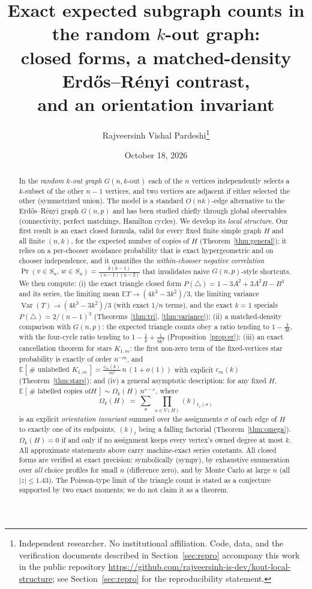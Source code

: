 \documentclass[11pt,a4paper]{article}
\title{Exact expected subgraph counts in the random $k$-out graph:\\
closed forms, a matched-density Erd\H{o}s--R\'enyi contrast,\\ and an orientation invariant}
\author{Rajveersinh Vishal Pardeshi\thanks{Independent researcher. No institutional
affiliation. Code, data, and the verification documents described in
Section~\ref{sec:repro} accompany this work in the public repository
\url{https://github.com/rajveersinh-is-dev/kout-local-structure}; see
Section~\ref{sec:repro} for the reproducibility statement.}}
\date{October 18, 2026}
\theoremstyle{definition}
\theoremstyle{definition}
\begin{document}
\maketitle

\begin{abstract}
In the \emph{random $k$-out graph} $G(n,k\text{-out})$ each of the $n$ vertices
independently selects a $k$-subset of the other $n-1$ vertices, and two vertices are
adjacent if either selected the other (symmetrized union). The model is a standard
$O(nk)$-edge alternative to the Erd\H{o}s--R\'enyi graph $G(n,p)$ and has been studied
chiefly through global observables (connectivity, perfect matchings, Hamilton cycles).
We develop its \emph{local structure}. Our first result is an exact closed formula,
valid for every fixed finite simple graph $H$ and all finite $(n,k)$, for the expected
number of copies of $H$ (Theorem~\ref{thm:general}); it relies on a per-chooser
avoidance probability that is exact hypergeometric and on chooser independence, and it
quantifies the \emph{within-chooser negative correlation}
$\Pr(v\in S_u,\, w\in S_u)=\frac{k(k-1)}{(n-1)(n-2)}$ that invalidates naive
$G(n,p)$-style shortcuts. We then compute: (i) the exact triangle closed form
$P(\triangle)=1-3A^{2}+3A^{2}B-B^{3}$ and its series, the limiting mean
$\mathbb E T \to (4k^{3}-3k^{2})/3$, the limiting variance
$\operatorname{Var}(T)\to(4k^{3}-3k^{2})/3$ (with exact $1/n$ terms), and the exact
$k=1$ specials $P(\triangle)=2/(n-1)^3$ (Theorems~\ref{thm:tri},
\ref{thm:variance}); (ii) a matched-density comparison with $G(n,p)$: the expected
triangle counts obey a ratio tending to $1-\frac{3}{4k}$, with the four-cycle ratio
tending to $1-\frac{1}{k}+\frac{1}{8k^{2}}$ (Proposition~\ref{prop:er}); (iii) an
exact cancellation theorem for stars $K_{1,m}$: the first non-zero term of the
fixed-vertices star probability is exactly of order $n^{-m}$, and
$\mathbb E[\,\#\text{ unlabelled }K_{1,m}\,] = \frac{c_m(k)}{m!}\,n\,(1+o(1))$ with
explicit $c_m(k)$ (Theorem~\ref{thm:stars}); and (iv) a general asymptotic
description: for any fixed $H$, $\mathbb E[\,\#\text{ labelled copies of
}H\,]\sim\Omega_k(H)\, n^{v-e}$, where
\[
\Omega_k(H)\;=\;\sum_{\sigma}\ \prod_{x\in V(H)}(k)_{t_x(\sigma)}
\]
is an explicit \emph{orientation invariant} summed over the assignments $\sigma$ of
each edge of $H$ to exactly one of its endpoints, $(k)_t$ being a falling factorial
(Theorem~\ref{thm:omega}). $\Omega_k(H)=0$ if and only if no assignment keeps every
vertex's owned degree at most $k$. All approximate statements above carry
machine-exact series constants. All closed forms are verified at exact precision:
symbolically (sympy), by exhaustive enumeration over \emph{all} choice profiles for
small $n$ (difference zero), and by Monte Carlo at large $n$ (all $|z|\le 1.43$). The
Poisson-type limit of the triangle count is stated as a conjecture supported by two
exact moments; we do not claim it as a theorem.
\end{abstract}
\end{document}
